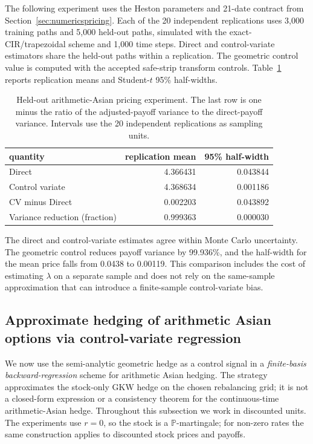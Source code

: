 \documentclass[10pt,a4paper,reqno]{amsart}
\theoremstyle{plain}
\theoremstyle{definition}
\theoremstyle{remark}
\theoremstyle{example}
\begin{document}
 The following experiment uses the Heston parameters and 21-date contract from
Section~\ref{sec:numericspricing}.  Each of the 20 independent replications uses 3,000 training paths
and 5,000 held-out paths, simulated with the exact-CIR/trapezoidal scheme and 1,000 time steps.
Direct and control-variate estimators share the held-out paths within a replication.  The geometric
control value is computed with the accepted safe-strip transform controls.  Table~\ref{tab:arithmetic-pricing}
reports replication means and Student-\(t\) 95\% half-widths.

 \begin{table}[htbp]
\centering
 \small
\begin{tabular}{lrr}
\toprule
quantity &  replication mean &  95\% half-width \\
 \midrule
Direct & 4.366431 & 0.043844 \\
Control variate & 4.368634 & 0.001186 \\
CV minus Direct & 0.002203 & 0.043892 \\
Variance reduction (fraction) & 0.999363 & 0.000030 \\
\bottomrule
\end{tabular}
\caption{ Held-out arithmetic-Asian pricing experiment.  The last row is one minus the  ratio of
the  adjusted-payoff variance to the  direct-payoff variance.   Intervals use the  20 independent
replications as  sampling units.}
 \label{tab:arithmetic-pricing}
\end{table}

 The direct and control-variate estimates agree within Monte Carlo uncertainty.  The geometric
control reduces payoff variance by 99.936\%, and the half-width for the mean price falls from
0.0438 to 0.00119.  This comparison includes the cost of estimating \(\lambda\) on a separate
sample and does not rely on the same-sample approximation that can introduce a finite-sample
control-variate bias.

\subsection{Approximate hedging of arithmetic Asian options via control-variate regression}\label{sec:CV-hedging-arithmetic}

We now use the semi-analytic geometric hedge as a control signal in a \emph{finite-basis backward-regression} scheme for arithmetic Asian hedging. The strategy approximates the stock-only GKW hedge on the chosen rebalancing grid; it is not a closed-form expression or a consistency theorem for the continuous-time arithmetic-Asian hedge. Throughout this subsection we work in discounted units. The experiments use $r=0$, so the stock is a $\mathbb P$-martingale; for non-zero rates the same construction applies to discounted stock prices and payoffs.
\end{document}
